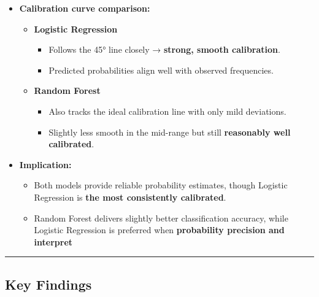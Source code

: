 \documentclass[
  letterpaper,
  DIV=11,
  numbers=noendperiod]{scrartcl}
\providecommand{\tightlist}{%
  \setlength{\itemsep}{0pt}\setlength{\parskip}{0pt}}
\begin{document}
\begin{itemize}
\tightlist
\item
  \textbf{Calibration curve comparison:}

  \begin{itemize}
  \tightlist
  \item
    \textbf{Logistic Regression}

    \begin{itemize}
    \tightlist
    \item
      Follows the 45° line closely → \textbf{strong, smooth
      calibration}.
    \item
      Predicted probabilities align well with observed frequencies.
    \end{itemize}
  \item
    \textbf{Random Forest}

    \begin{itemize}
    \tightlist
    \item
      Also tracks the ideal calibration line with only mild deviations.
    \item
      Slightly less smooth in the mid-range but still \textbf{reasonably
      well calibrated}.
    \end{itemize}
  \end{itemize}
\item
  \textbf{Implication:}

  \begin{itemize}
  \tightlist
  \item
    Both models provide reliable probability estimates, though Logistic
    Regression is \textbf{the most consistently calibrated}.
  \item
    Random Forest delivers slightly better classification accuracy,
    while Logistic Regression is preferred when \textbf{probability
    precision and interpret}
  \end{itemize}
\end{itemize}

\begin{center}\rule{0.5\linewidth}{0.5pt}\end{center}

\subsection{Key Findings}\label{key-findings}
\end{document}
